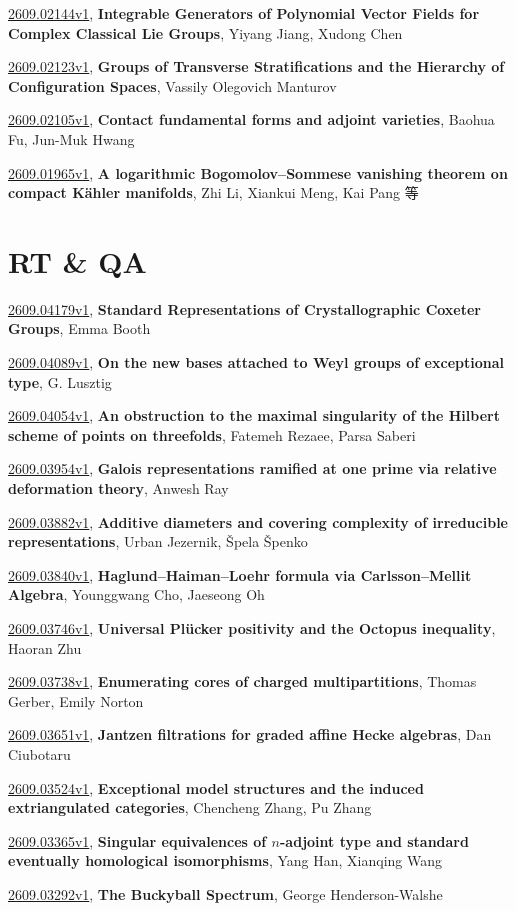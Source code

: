 \documentclass[9pt, a4paper]{article}
\theoremstyle{plain}
\theoremstyle{definition}
\theoremstyle{remark}
\newcommand{\arxiv}[3]{\href{https://arxiv.org/abs/#1}{#1}, \textbf{\textcolor{arxivblue}{#2}}, #3}
\begin{document}
\arxiv{2609.02144v1}{Integrable Generators of Polynomial Vector Fields for Complex Classical Lie Groups}{Yiyang Jiang, Xudong Chen}

\arxiv{2609.02123v1}{Groups of Transverse Stratifications and the Hierarchy of Configuration Spaces}{Vassily Olegovich Manturov}

\arxiv{2609.02105v1}{Contact fundamental forms and adjoint varieties}{Baohua Fu, Jun-Muk Hwang}

\arxiv{2609.01965v1}{A logarithmic Bogomolov--Sommese vanishing theorem on compact Kähler manifolds}{Zhi Li, Xiankui Meng, Kai Pang 等}


\section{RT \& QA}
\arxiv{2609.04179v1}{Standard Representations of Crystallographic Coxeter Groups}{Emma Booth}

\arxiv{2609.04089v1}{On the new bases attached to Weyl groups of exceptional type}{G. Lusztig}

\arxiv{2609.04054v1}{An obstruction to the maximal singularity of the Hilbert scheme of points on threefolds}{Fatemeh Rezaee, Parsa Saberi}

\arxiv{2609.03954v1}{Galois representations ramified at one prime via relative deformation theory}{Anwesh Ray}

\arxiv{2609.03882v1}{Additive diameters and covering complexity of irreducible representations}{Urban Jezernik, Špela Špenko}

\arxiv{2609.03840v1}{Haglund--Haiman--Loehr formula via Carlsson--Mellit Algebra}{Younggwang Cho, Jaeseong Oh}

\arxiv{2609.03746v1}{Universal Plücker positivity and the Octopus inequality}{Haoran Zhu}

\arxiv{2609.03738v1}{Enumerating cores of charged multipartitions}{Thomas Gerber, Emily Norton}

\arxiv{2609.03651v1}{Jantzen filtrations for graded affine Hecke algebras}{Dan Ciubotaru}

\arxiv{2609.03524v1}{Exceptional model structures and the induced extriangulated categories}{Chencheng Zhang, Pu Zhang}

\arxiv{2609.03365v1}{Singular equivalences of $n$-adjoint type and standard eventually homological isomorphisms}{Yang Han, Xianqing Wang}

\arxiv{2609.03292v1}{The Buckyball Spectrum}{George Henderson-Walshe}
\end{document}
